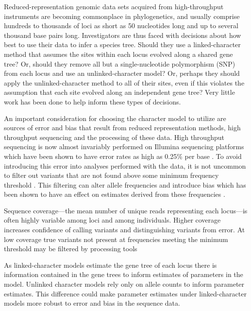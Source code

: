 Reduced-representation genomic data sets acquired from high-throughput instruments
are becoming commonplace in phylogenetics, and usually comprise hundreds to 
thousands of loci as short as 50 nucleotides long and up to several thousand 
base pairs long. Investigators are thus faced with decisions about how best to 
use their data to infer a species tree. Should they use a linked-character 
method that assumes the sites within each locus evolved along a shared gene 
tree? Or, should they remove all but a single-nucleotide polymorphism (SNP) from 
each locus and use an unlinked-character model? Or, perhaps they should apply 
the unlinked-character method to all of their sites, even if this violates the 
assumption that each site evolved along an independent gene tree? Very little 
work has been done to help inform these types of decisions. 

An important consideration for choosing the character model to utilize are
sources of error and bias that result from reduced representation methods,
high throughput sequencing and the processing of these data. High throughput
sequencing is now almost invariably performed on Illumina sequencing platforms
which have been shown to have error rates as high as 0.25\% per base 
\citep{@pfeifferSystematicEvaluationError2018}. 
To avoid introducing this error into analyses performed with the data, it is not 
uncommon to filter out variants that are not found above some minimum frequency 
threshold \citep{rochetteStacksAnalyticalMethods2019, linckMinorAlleleFrequency2019}. 
This filtering can alter allele frequencies and introduce bias which has been 
shown to have an effect on estimates derived from these frequencies \citep{linckMinorAlleleFrequency2019}.

Sequence coverage---the mean number of unique reads representing each locus---is
often highly variable among loci and among individuals. Higher coverage increases 
confidence of calling variants and distinguishing variants from error. 
At low coverage true variants not present at frequencies meeting the minimum threshold
may be filtered by processing tools 

As linked-character models estimate the gene tree of each locus there is 
information contained in the gene trees to inform estimates of parameters in the model. 
Unlinked character models rely only on allele counts to inform parameter 
estimates. This difference could make parameter estimates under linked-character 
models more robust to error and bias in the sequence data.

